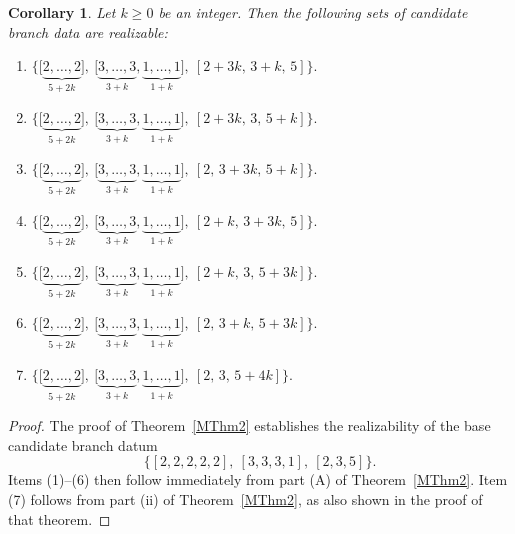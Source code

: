 \documentclass[10pt,a4paper]{amsart}
\newtheorem{cor}{Corollary}
\begin{document}
\begin{cor}\label{Co1}
Let $k \ge 0$ be an integer. Then the following sets of candidate branch data are realizable:
\begin{enumerate}
\item $\displaystyle
\bigl\{
   \bigl[ \underbrace{2,\ldots,2}_{5+2k} \bigr],\
   \bigl[ \underbrace{3,\ldots,3}_{3+k},\underbrace{1,\ldots,1}_{1+k} \bigr],\
   [2+3k,\,3+k,\,5]
\bigr\}.
$
\item $\displaystyle
\bigl\{
   \bigl[ \underbrace{2,\ldots,2}_{5+2k} \bigr],\
   \bigl[ \underbrace{3,\ldots,3}_{3+k},\underbrace{1,\ldots,1}_{1+k} \bigr],\
   [2+3k,\,3,\,5+k]
\bigr\}.
$

\item $\displaystyle
\bigl\{
   \bigl[ \underbrace{2,\ldots,2}_{5+2k} \bigr],\
   \bigl[ \underbrace{3,\ldots,3}_{3+k},\underbrace{1,\ldots,1}_{1+k} \bigr],\
   [2,\,3+3k,\,5+k]
\bigr\}.
$

\item $\displaystyle
\bigl\{
   \bigl[ \underbrace{2,\ldots,2}_{5+2k} \bigr],\
   \bigl[ \underbrace{3,\ldots,3}_{3+k},\underbrace{1,\ldots,1}_{1+k} \bigr],\
   [2+k,\,3+3k,\,5]
\bigr\}.
$

\item $\displaystyle
\bigl\{
   \bigl[ \underbrace{2,\ldots,2}_{5+2k} \bigr],\
   \bigl[ \underbrace{3,\ldots,3}_{3+k},\underbrace{1,\ldots,1}_{1+k} \bigr],\
   [2+k,\,3,\,5+3k]
\bigr\}.
$

\item $\displaystyle
\bigl\{
   \bigl[ \underbrace{2,\ldots,2}_{5+2k} \bigr],\
   \bigl[ \underbrace{3,\ldots,3}_{3+k},\underbrace{1,\ldots,1}_{1+k} \bigr],\
   [2,\,3+k,\,5+3k]
\bigr\}.
$

\item $\displaystyle
\bigl\{
   \bigl[ \underbrace{2,\ldots,2}_{5+2k} \bigr],\
   \bigl[ \underbrace{3,\ldots,3}_{3+k},\underbrace{1,\ldots,1}_{1+k} \bigr],\
   [2,\,3,\,5+4k]
\bigr\}.
$
\end{enumerate}
\end{cor}

\begin{proof}
The proof of Theorem~\ref{MThm2} establishes the realizability of the base candidate branch datum
\[
\bigl\{
 [2,2,2,2,2],\
  [3,3,3,1],\
  [2,3,5]
\bigr\}.
\]
Items (1)--(6) then follow immediately from part (A) of Theorem~\ref{MThm2}. Item (7) follows from part (ii) of Theorem~\ref{MThm2}, as also shown in the proof of that theorem.
\end{proof}
\end{document}
